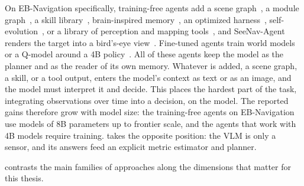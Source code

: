 On EB-Navigation specifically, training-free agents add a scene graph~\cite{huang2025esca}, a module graph~\cite{wang2026mosaic},
a skill library~\cite{ju2026embodiskill}, brain-inspired memory~\cite{ma2026brainmem},
an optimized harness~\cite{lee2026emho}, self-evolution~\cite{liang2026robofoundry}, or a library of perception and
mapping tools~\cite{zhou2026enabling}, and SeeNav-Agent renders the target into a bird's-eye view~\cite{wang2025seenav}.
Fine-tuned agents train world models or a Q-model around a 4B policy~\cite{jang2026musix,xie2026sva}.
All of these agents keep the model as the planner and as the reader of its own memory. Whatever is added, a
scene graph, a skill, or a tool output, enters the model's context as text or as an image, and the model must
interpret it and decide. This places the hardest part of the task, integrating observations over time into a
decision, on the model. The reported gains therefore grow with model size: the training-free agents on
EB-Navigation use models of 8B parameters up to frontier scale, and the agents that work with 4B models require
training. \ours takes the opposite position: the VLM is only a sensor, and its answers feed an explicit metric
estimator and planner.

 contrasts the main families of approaches along the dimensions that matter for this thesis.

\begin{table}[htbp]
\centering\small
\caption[Families of approaches to instruction-following navigation]{Families of approaches to instruction-following
navigation. ``Open'' instructions describe the target by use or appearance as well as by name.}
\label{tab:lit-compare}
\end{table}


